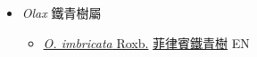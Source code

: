 
  \begin{itemize}
 \item[] \textit{Olax} 鐵青樹屬
                    
  \begin{itemize}
        \item[] \href{http://www.theplantlist.org/tpl1.1/search?q=Olax+imbricata}{\textit{O. imbricata} Roxb.}   \href{\detokenize{http://taibnet.sinica.edu.tw/chi/taibnet_species_list.php?T2=菲律賓鐵青樹&T2_new_value=true&fr=y}}{菲律賓鐵青樹} EN
  \end{itemize}
  \end{itemize}
